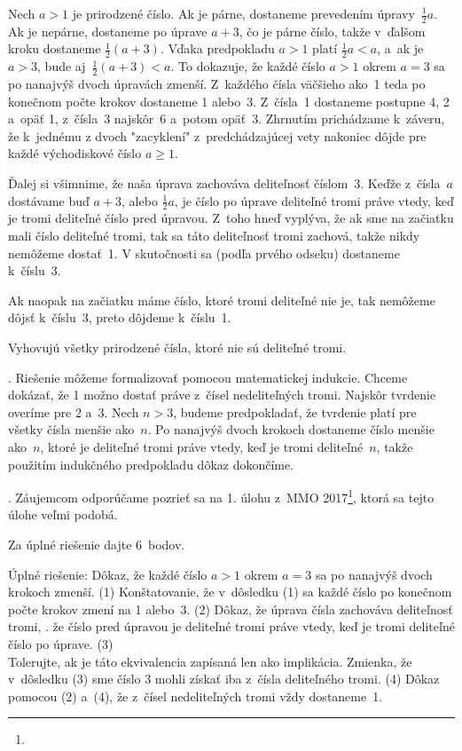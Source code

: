 {%
Nech $a>1$ je prirodzené číslo. Ak je
párne, dostaneme prevedením úpravy~$\frac12 {a}$. Ak je nepárne,
dostaneme po úprave $a+3$, čo je párne číslo, takže
v~ďalšom kroku dostaneme $\frac12 (a+3)$. Vďaka predpokladu $a>1$ platí
$\frac 12{a}<a$, a~ak je $a>3$, bude aj~$\frac12 (a+3)<a$. To dokazuje, že
každé číslo $a>1$ okrem $a=3$ sa po nanajvýš dvoch úpravách
zmenší. Z~každého čísla väčšieho ako~1 teda po konečnom
počte krokov dostaneme 1 alebo~3.
Z~čísla~1 dostaneme postupne 4, 2 a~opäť 1, z~čísla~3 najskôr~6 a~potom opäť~3.
Zhrnutím prichádzame k~záveru, že k~jednému z dvoch "zacyklení" z~predchádzajúcej vety
nakoniec dôjde pre každé východiskové číslo $a\ge1$.

Ďalej si všimnime, že naša úprava zachováva deliteľnosť
číslom~3. Keďže z~čísla~$a$ dostávame buď $a+3$, alebo $\frac12 {a}$,
je číslo po úprave deliteľné tromi práve vtedy, keď je tromi deliteľné
číslo pred úpravou.
Z~toho hneď vyplýva, že ak sme na začiatku mali
číslo deliteľné tromi, tak sa táto deliteľnosť tromi zachová,
takže nikdy nemôžeme dostať~1. V skutočnosti sa (podľa prvého
odseku) dostaneme k~číslu~3.

Ak naopak na začiatku máme číslo, ktoré tromi deliteľné nie je, tak
nemôžeme dôjsť k~číslu~3, preto dôjdeme k~číslu~1.

\zaver
Vyhovujú všetky prirodzené čísla, ktoré nie sú
deliteľné tromi.

.
Riešenie môžeme formalizovať pomocou matematickej indukcie.
Chceme dokázať, že 1 možno dostať práve z~čísel nedeliteľných tromi.
Najskôr tvrdenie overíme pre 2 a~3. Nech $n>3$, budeme predpokladať,
že tvrdenie platí pre všetky čísla menšie ako~$n$.
Po nanajvýš dvoch krokoch dostaneme číslo menšie ako~$n$, ktoré je
deliteľné tromi práve vtedy, keď je tromi deliteľné~$n$, takže použitím
indukčného predpokladu dôkaz dokončíme.

.
Záujemcom odporúčame pozrieť sa na 1. úlohu z~MMO 2017\footnote{},
ktorá sa tejto úlohe veľmi podobá.



\schemaABC
Za úplné riešenie dajte 6~bodov.

Úplné riešenie:
\* [2 body] Dôkaz, že každé číslo $a> 1$ okrem $a= 3$ sa po nanajvýš dvoch krokoch zmenší. (1)
\* [1 bod] Konštatovanie, že v~dôsledku (1) sa každé číslo po konečnom počte krokov zmení na 1 alebo~3. (2)
\* [1 bod] Dôkaz, že úprava čísla zachováva deliteľnosť tromi, \tj. že
číslo pred úpravou je deliteľné tromi práve vtedy, keď je tromi deliteľné
číslo po úprave. (3)\\
Tolerujte, ak je táto ekvivalencia zapísaná len ako implikácia.
\* [1 bod] Zmienka, že v~dôsledku (3) sme číslo 3 mohli získať iba z~čísla deliteľného tromi. (4)
\* [1 bod] Dôkaz pomocou (2) a~(4), že z~čísel nedeliteľných tromi vždy dostaneme~1.

}
